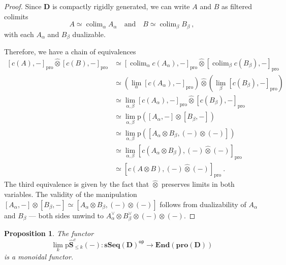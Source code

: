 \documentclass[a4paper,12pt]{amsart}
\DeclareMathOperator*{\colim}{colim}
\theoremstyle{plain}
\newtheorem{proposition}[theorem]{Proposition}%
\theoremstyle{definition}
\theoremstyle{remark}
\begin{document}
\begin{proof}
Since $\mathbf{D}$ is compactly rigidly generated, we can write $A$ and $B$ as filtered colimits 
\[
A \simeq \colim_{\alpha} A_\alpha \quad \text{and} \quad B \simeq \colim_{\beta} B_\beta~, 
\]
with each $A_\alpha$ and $B_\beta$ dualizable. 

Therefore, we have a chain of equivalences
\begin{align*}
\left[c(A),-\right]_{\mathrm{pro}} \widehat{\otimes} \left[c(B),-\right]_{\mathrm{pro}} &\simeq \left[\colim_{\alpha} c(A_\alpha),-\right]_{\mathrm{pro}} \widehat{\otimes} \left[\colim_{\beta} c(B_\beta),-\right]_{\mathrm{pro}} \\
&\simeq \left(\lim_{\alpha} \left[c(A_\alpha),-\right]_{\mathrm{pro}}\right) \widehat{\otimes} \left( \lim_{\beta}\left[c(B_\beta),-\right]_{\mathrm{pro}}\right) \\
&\simeq \lim_{\alpha,\beta} \left[c(A_\alpha),-\right]_{\mathrm{pro}} \widehat{\otimes} \left[ c(B_\beta),-\right]_{\mathrm{pro}} \\
&\simeq \lim_{\alpha,\beta} \mathrm{p}\left(\left[A_\alpha,-\right] \otimes \left[ B_\beta,-\right]\right)\\
&\simeq \lim_{\alpha,\beta} \mathrm{p}\left(\left[A_\alpha \otimes B_\beta, (-) \otimes (-) \right]\right) \\
&\simeq \lim_{\alpha,\beta} \left[c(A_\alpha \otimes B_\beta), (-) \widehat\otimes (-) \right]_{\mathrm{pro}} \\
&\simeq \left[c(A \otimes B),(-) \widehat\otimes (-)\right]_{\mathrm{pro}}~.
\end{align*}
The third equivalence is given by the fact that $\widehat{\otimes}$ preserves limits in both variables. The validity of the manipulation $[A_\alpha,-]\otimes [B_\beta,-] \simeq [A_\alpha \otimes B_\beta,(-) \otimes (-) ]$ follows from dualizability of $A_\alpha$ and $B_\beta$ --- both sides unwind to $A_\alpha^\vee \otimes B_\beta^\vee \otimes (-) \otimes (-) $.
\end{proof}

\begin{proposition}
The functor 
\[
\lim_k \mathrm{p}\widehat{\mathbf{S}}^c_{\leq k}(-): \mathbf{sSeq}(\mathbf{D})^{\mathsf{op}} \longrightarrow \mathbf{End}(\mathbf{pro}(\mathbf{D}))
\]
is a monoidal functor. 
\end{proposition}
\end{document}
